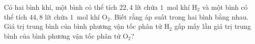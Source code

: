 	\begin{ex}%
		Có hai bình khí, một bình có thể tích $22{,}4$ lít chứa $1$~mol khí $\text{H}_2$ và một bình có thể tích $44{,}8$ lít chứa $1$~mol khí $\text{O}_2$. Biết rằng áp suất trong hai bình bằng nhau. Giá trị trung bình của bình phương vận tốc phân tử $\text{H}_2$ gấp mấy lần giá trị trung bình của bình phương vận tốc phân tử $\text{O}_2$?
		\par
	\end{ex}

